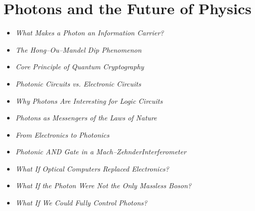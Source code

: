 \section{Photons and the Future of Physics}
\vspace{1em}
\begin{tcolorbox}[title=Physical Boxes, physikbox]
	\begin{itemize}
		\item \emph{What Makes a Photon an Information Carrier?} \dotfill\pageref{box:photon_information}
		\item \emph{The Hong–Ou–Mandel Dip Phenomenon} \dotfill\pageref{box:hong_ou_mandel}
		\item \emph{Core Principle of Quantum Cryptography} \dotfill\pageref{box:qcrypto_prinzip}
		\item \emph{Photonic Circuits vs. Electronic Circuits} \dotfill\pageref{box:photon_vs_electron}
		\item \emph{Why Photons Are Interesting for Logic Circuits} \dotfill\pageref{box:optlogik_vorteile}
		\item \emph{Photons as Messengers of the Laws of Nature} \dotfill\pageref{box:photonen_grundlagen}
	\end{itemize}
\end{tcolorbox}

\vspace{1em}
\begin{tcolorbox}[title=Didactic Boxes, didaktikbox]
	\begin{itemize}
		\item \emph{From Electronics to Photonics} \dotfill\pageref{box:optlogik_didaktik}
		\item \emph{Photonic AND Gate in a Mach–Zehnder\newline Interferometer} \dotfill\pageref{box:mzi_and}
	\end{itemize}
\end{tcolorbox}

\vspace{1em}
\begin{tcolorbox}[title=Hypothetical Boxes, hypobox]
	\begin{itemize}
		\item \emph{What If Optical Computers Replaced Electronics?} \dotfill\pageref{box:optlogik_zukunft}
		\item \emph{What If the Photon Were Not the \newline Only Massless Boson?} \dotfill\pageref{box:photon_neue_physik}
		\item \emph{What If We Could Fully Control Photons?} \dotfill\pageref{box:hypo_kapVII}
	\end{itemize}
\end{tcolorbox}

